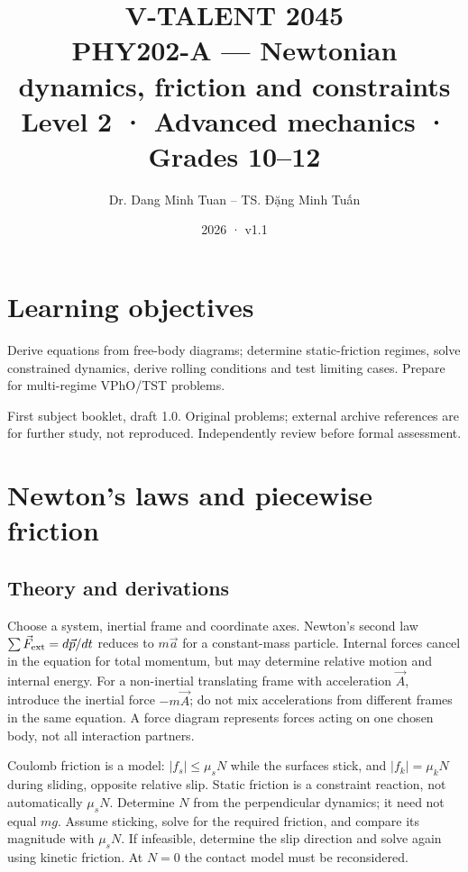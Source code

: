\documentclass[11pt,a4paper,openany]{book}
\begin{document}
\title{V-TALENT 2045\\ PHY202-A --- Newtonian dynamics, friction and constraints\\\large Level 2 · Advanced mechanics · Grades 10–12}
\author{Dr. Dang Minh Tuan -- TS. Đặng Minh Tuấn}
\date{2026 · v1.1}
\maketitle
\tableofcontents
\chapter*{Learning objectives}
Derive equations from free-body diagrams; determine static-friction regimes, solve constrained dynamics, derive rolling conditions and test limiting cases. Prepare for multi-regime VPhO/TST problems.

First subject booklet, draft 1.0. Original problems; external archive references are for further study, not reproduced. Independently review before formal assessment.
\chapter{Newton's laws and piecewise friction}
\section{Theory and derivations}
Choose a system, inertial frame and coordinate axes. Newton's second law $\sum\vec F_{\rm ext}=d\vec p/dt$ reduces to $m\vec a$ for a constant-mass particle. Internal forces cancel in the equation for total momentum, but may determine relative motion and internal energy. For a non-inertial translating frame with acceleration $\vec A$, introduce the inertial force $-m\vec A$; do not mix accelerations from different frames in the same equation. A force diagram represents forces acting on one chosen body, not all interaction partners.

Coulomb friction is a model: $|f_s|\le\mu_s N$ while the surfaces stick, and $|f_k|=\mu_k N$ during sliding, opposite relative slip. Static friction is a constraint reaction, not automatically $\mu_sN$. Determine $N$ from the perpendicular dynamics; it need not equal $mg$. Assume sticking, solve for the required friction, and compare its magnitude with $\mu_sN$. If infeasible, determine the slip direction and solve again using kinetic friction. At $N=0$ the contact model must be reconsidered.
\end{document}
